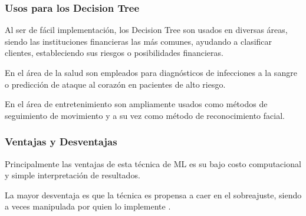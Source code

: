 \doublespacing
\subsubsection{Usos para los Decision Tree}
Al ser de fácil implementación, los Decision Tree son usados en diversas áreas, siendo las instituciones financieras las más comunes, ayudando a clasificar clientes, estableciendo sus riesgos o posibilidades financieras.\\
\par En el área de la salud son empleados para diagnósticos de infecciones a la sangre o predicción de ataque al corazón en pacientes de alto riesgo.\\
\par En el área de entretenimiento son ampliamente usados como métodos de seguimiento de movimiento y a su vez como método de reconocimiento facial.

\doublespacing
\subsubsection{Ventajas y Desventajas}
Principalmente las ventajas de esta técnica de ML es su bajo costo computacional y simple interpretación de resultados. \\
\par La mayor desventaja es que la técnica es propensa a caer en el sobreajuste, siendo a veces manipulada por quien lo implemente \cite{Harrington2012}.\\


\doublespacing
